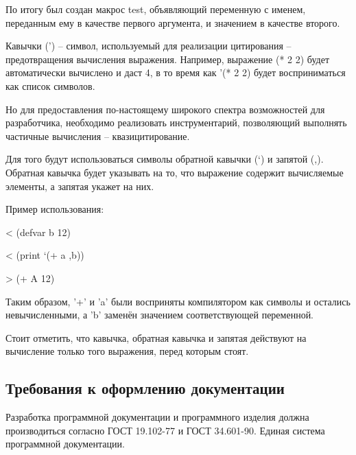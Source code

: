 По итогу был создан макрос test, объявляющий переменную с именем, переданным ему в качестве первого аргумента, и значением в качестве второго.

Кавычки (') -- символ, используемый для реализации цитирования -- предотвращения вычисления выражения. Например, выражение (* 2 2) будет автоматически вычислено и даст 4, в то время как '(* 2 2) будет восприниматься как список символов.

Но для предоставления по-настоящему широкого спектра возможностей для разработчика, необходимо реализовать инструментарий, позволяющий выполнять частичные вычисления -- квазицитирование.

Для того будут использоваться символы обратной кавычки (`) и запятой (,). Обратная кавычка будет указывать на то, что выражение содержит вычисляемые элементы, а запятая укажет на них.

Пример использования:

< (defvar b 12)

< (print `(+ a ,b))

> (+ A 12)

Таким образом, '+' и 'a' были восприняты компилятором как символы и остались невычисленными, а 'b' заменён значением соответствующей переменной.

Стоит отметить, что кавычка, обратная кавычка и запятая действуют на вычисление только того выражения, перед которым стоят.

\subsection{Требования к оформлению документации}

Разработка программной документации и программного изделия должна производиться согласно ГОСТ 19.102-77 и ГОСТ 34.601-90. Единая система программной документации.
